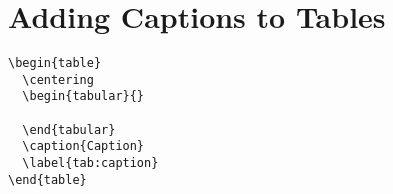 \section{Adding Captions to Tables}
\label{sec:adding-capt-tabl}


\begin{lstlisting}
\begin{table}
  \centering
  \begin{tabular}{}
    
  \end{tabular}
  \caption{Caption}
  \label{tab:caption}
\end{table}  
\end{lstlisting}

